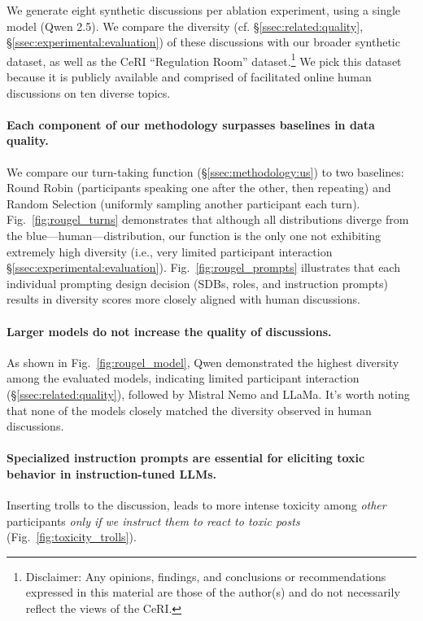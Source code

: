 We generate eight synthetic discussions per ablation experiment, using a single model (Qwen 2.5). We compare the diversity (cf. \S\ref{ssec:related:quality}, \S\ref{ssec:experimental:evaluation}) of these discussions with our broader synthetic dataset, as well as the CeRI “Regulation Room” dataset.\footnote{Disclaimer: Any opinions, findings, and conclusions or recommendations expressed in this material are those of the author(s) and do not necessarily reflect the views of the CeRI.} We pick this dataset because it is publicly available and comprised of facilitated online human discussions on ten diverse topics.

\paragraph{Each component of our methodology surpasses baselines in data quality.} We compare our turn-taking function (\S\ref{ssec:methodology:us}) to two baselines: Round Robin (participants speaking one after the other, then repeating) and Random Selection (uniformly sampling another participant each turn). Fig.~\ref{fig:rougel_turns} demonstrates that although all distributions diverge from the blue—human—distribution, our function is the only one not exhibiting extremely high diversity (i.e., very limited participant interaction \S\ref{ssec:experimental:evaluation}). Fig.~\ref{fig:rougel_prompts} illustrates that each individual prompting design decision (SDBs, roles, and instruction prompts) results in diversity scores more closely aligned with human discussions.

\paragraph{Larger models do not increase the quality of discussions.} As shown in Fig.~\ref{fig:rougel_model}, Qwen demonstrated the highest diversity among the evaluated models, indicating limited participant interaction (\S\ref{ssec:related:quality}), followed by Mistral Nemo and LLaMa. It's worth noting that none of the models closely matched the diversity observed in human discussions. 

\paragraph{Specialized instruction prompts are essential for eliciting toxic behavior in instruction-tuned LLMs.} Inserting trolls to the discussion, leads to more intense toxicity among \emph{other} participants \emph{only if we instruct them to react to toxic posts} (Fig.~\ref{fig:toxicity_trolls}). 

